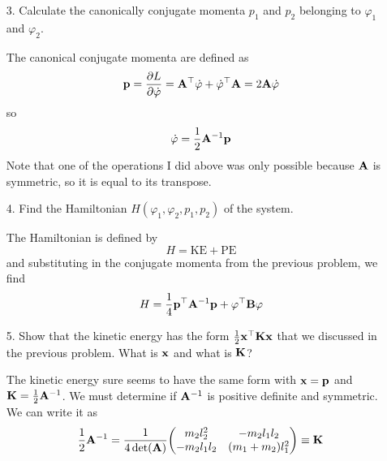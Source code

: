 \documentclass[a4paper,twoside]{article}
\begin{document}
\begin{itemize}
    \item[3.] Calculate the canonically conjugate momenta $ p_1 $ and $ p_2 $ belonging to $ \varphi_1 $ and $ \varphi_2 $.
        \begin{problem}
            The canonical conjugate momenta are defined as
            \begin{equation}
                \vb{p} = \pdv{L}{\dot{\vb{\varphi}}} = \vb{A}^\top \dot{\vb{\varphi}} + \dot{\vb{\varphi}}^\top \vb{A} = 2 \vb{A} \dot{\vb{\varphi}}
            \end{equation}
            so
            \begin{equation}
                \dot{\vb{\varphi}} = \frac{1}{2} \vb{A}^{-1} \vb{p}
            \end{equation}
            Note that one of the operations I did above was only possible because $ \vb{A} $ is symmetric, so it is equal to its transpose.
        \end{problem}
    \item[4.] Find the Hamiltonian $ H(\varphi_1, \varphi_2, p_1, p_2) $ of the system.
        \begin{problem}
            The Hamiltonian is defined by
            \begin{equation}
                H = \text{KE} + \text{PE}
            \end{equation}
            and substituting in the conjugate momenta from the previous problem, we find
            \begin{equation}
                H = \frac{1}{4} \vb{p}^\top \vb{A}^{-1} \vb{p} + \vb{\varphi}^\top \vb{B} \vb{\varphi}
            \end{equation}
        \end{problem}
    \item[5.] Show that the kinetic energy has the form $ \frac{1}{2} \vb{x}^\top \vb{K} \vb{x} $ that we discussed in the previous problem. What is $ \vb{x} $ and what is $ \vb{K} $?
        \begin{problem}
            The kinetic energy sure seems to have the same form with $ \vb{x} = \vb{p} $ and $ \vb{K} = \frac{1}{2} \vb{A}^{-1} $. We must determine if $ \vb{A}^{-1} $ is positive definite and symmetric. We can write it as
            \begin{equation}
                \frac{1}{2} \vb{A}^{-1} = \frac{1}{4\det(\vb{A})} \mqty( m_2 l_2^2 & - m_2 l_1 l_2 \\ - m_2 l_1 l_2 & (m_1 + m_2) l_1^2) \equiv \vb{K}
            \end{equation}

\end{problem}
\end{itemize}
\end{document}
